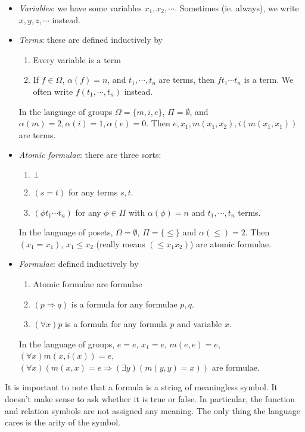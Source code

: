 \documentclass[a4paper]{article}
\begin{document}
\begin{defi}[Language]
  \begin{itemize}
    \item \emph{Variables}: we have some variables $x_1, x_2, \cdots$. Sometimes (ie. always), we write $x, y, z, \cdots$ instead.
    \item \emph{Terms}: these are defined inductively by
      \begin{enumerate}
        \item Every variable is a term
        \item If $f\in \Omega$, $\alpha(f) = n$, and $t_1, \cdots, t_n$ are terms, then $ft_1\cdots t_n$ is a term. We often write $f(t_1, \cdots, t_n)$ instead.
      \end{enumerate}
      \begin{eg}
        In the language of groups $\Omega = \{m, i, e\}$, $\Pi = \emptyset$, and $\alpha (m) = 2, \alpha(i) = 1, \alpha(e) = 0$. Then $e, x_1, m(x_1, x_2), i(m(x_1, x_1))$ are terms.
      \end{eg}
    \item \emph{Atomic formulae}: there are three sorts:
      \begin{enumerate}
        \item $\bot$
        \item $(s = t)$ for any terms $s, t$.
        \item $(\phi t_1 \cdots t_n)$ for any $\phi\in \Pi$ with $\alpha(\phi) = n$ and $t_1, \cdots, t_n$ terms.
      \end{enumerate}
      \begin{eg}
        In the language of posets, $\Omega = \emptyset$, $\Pi=\{\leq\}$ and $\alpha(\leq) = 2$. Then $(x_1 = x_1)$, $x_1\leq x_2$ (really means $(\leq x_1x_2)$) are atomic formulae.
      \end{eg}
    \item \emph{Formulae}: defined inductively by
      \begin{enumerate}
        \item Atomic formulae are formulae
        \item $(p \Rightarrow q)$ is a formula for any formulae $p, q$.
        \item $(\forall x) p$ is a formula for any formula $p$ and variable $x$.
      \end{enumerate}
      \begin{eg}
        In the language of groups, $e = e$, $x_1 = e$, $m(e, e) = e$, $(\forall x) m(x, i(x)) = e$, $(\forall x)(m(x, x) = e \Rightarrow (\exists y) (m(y, y) = x))$ are formulae.
      \end{eg}
  \end{itemize}
\end{defi}
It is important to note that a formula is a string of meaningless symbol. It doesn't make sense to ask whether it is true or false. In particular, the function and relation symbols are not assigned any meaning. The only thing the language cares is the arity of the symbol.
\end{document}

